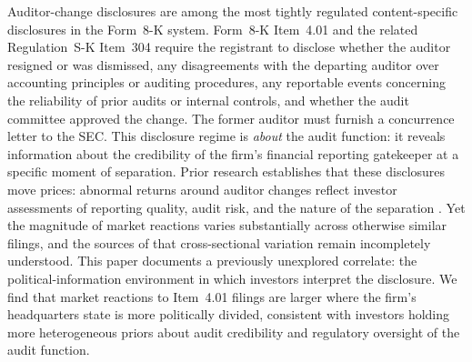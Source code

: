 \documentclass[12pt]{article}
\begin{document}
Auditor-change disclosures are among the most tightly regulated content-specific
disclosures in the Form~8-K system. Form~8-K Item~4.01 and the related
Regulation~S-K Item~304 require the registrant to disclose whether the
auditor resigned or was dismissed, any disagreements with the departing
auditor over accounting principles or auditing procedures, any reportable
events concerning the reliability of prior audits or internal controls, and
whether the audit committee approved the change. The former auditor must
furnish a concurrence letter to the SEC. This disclosure regime is
\emph{about} the audit function: it reveals information about the credibility
of the firm's financial reporting gatekeeper at a specific moment of
separation. Prior research establishes that these disclosures move prices:
abnormal returns around auditor changes reflect investor assessments of
reporting quality, audit risk, and the nature of the separation
\citep{johnson1990, dodd1984, defond1998, shu2000, landsman2009,
whisenant2003, hennes2014}. Yet the magnitude of market reactions varies
substantially across otherwise similar filings, and the sources of that
cross-sectional variation remain incompletely understood. This paper
documents a previously unexplored correlate: the political-information
environment in which investors interpret the disclosure. We find that
market reactions to Item~4.01 filings are larger where the firm's
headquarters state is more politically divided, consistent with investors
holding more heterogeneous priors about audit credibility and regulatory
oversight of the audit function.
\end{document}
